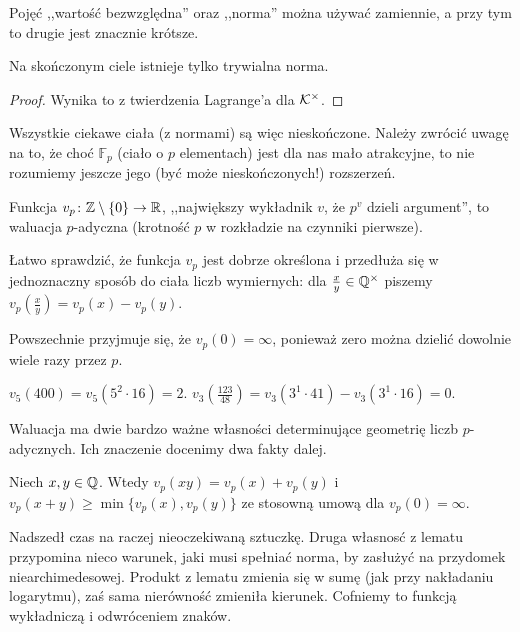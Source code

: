 Pojęć ,,wartość bezwzględna'' oraz ,,norma'' można używać zamiennie, a przy tym to drugie jest znacznie krótsze.

\begin{fakt}
	Na skończonym ciele istnieje tylko trywialna norma.
\end{fakt}

\begin{proof}
	Wynika to z twierdzenia Lagrange'a dla $\mathcal K^\times$.
\end{proof}

Wszystkie ciekawe ciała (z normami) są więc nieskończone.
Należy zwrócić uwagę na to, że choć $\mathbb F_p$ (ciało o $p$ elementach) jest dla nas mało atrakcyjne, to nie rozumiemy jeszcze jego (być może nieskończonych!) rozszerzeń.

\begin{definicja}
	Funkcja $v_p \colon \mathbb Z \setminus \{0\} \to \mathbb R$, ,,największy wykładnik $v$, że $p^v$ dzieli argument'', to waluacja $p$-adyczna (krotność $p$ w rozkładzie na czynniki pierwsze).
\end{definicja}

Łatwo sprawdzić, że funkcja $v_p$ jest dobrze określona i przedłuża się w jednoznaczny sposób do ciała liczb wymiernych: dla $\frac x y \in \mathbb Q^\times$ piszemy $v_p(\frac xy) = v_p(x) - v_p(y)$.

Powszechnie przyjmuje się, że $v_p(0) = \infty$, ponieważ zero można dzielić dowolnie wiele razy przez $p$.

\begin{przyklad}
	$v_5(400) = v_5(5^2 \cdot 16) = 2$.
	$v_3(\frac{123}{48}) = v_3(3^1 \cdot 41) - v_3(3^1 \cdot 16) = 0$.
\end{przyklad}

Waluacja ma dwie bardzo ważne własności determinujące geometrię liczb $p$-adycznych.
Ich znaczenie docenimy dwa fakty dalej.

\begin{lemat} \label{diewildenjahre}
	Niech $x, y \in \mathbb Q$.
	Wtedy $v_p(xy) = v_p(x) + v_p(y)$ i $v_p(x+y) \ge \min \{v_p(x), v_p(y)\}$ ze stosowną umową dla $v_p(0) = \infty$.
\end{lemat}

Nadszedł czas na raczej nieoczekiwaną sztuczkę.
Druga własnosć z lematu przypomina nieco warunek, jaki musi spełniać norma, by zasłużyć na przydomek niearchimedesowej.
Produkt z lematu zmienia się w sumę (jak przy nakładaniu logarytmu), zaś sama nierówność zmieniła kierunek.
Cofniemy to funkcją wykładniczą i odwróceniem znaków.


